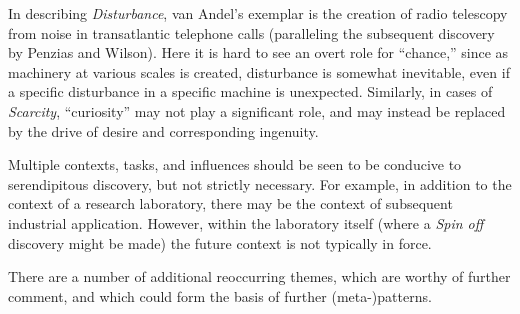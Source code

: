 In describing \emph{Disturbance}, van Andel's exemplar is the
creation of radio telescopy from noise in transatlantic telephone calls
(paralleling the subsequent discovery by Penzias and Wilson).  Here it
is hard to see an overt role for ``chance,'' since as machinery at
various scales is created, disturbance is somewhat inevitable, even if
a specific disturbance in a specific machine is unexpected.
Similarly, in cases of \emph{Scarcity}, ``curiosity'' may not play a
significant role, and may instead be replaced by the drive of desire
and corresponding ingenuity.

Multiple contexts, tasks, and influences should be seen to be
conducive to serendipitous discovery, but not strictly necessary.  For
example, in addition to the context of a research laboratory, there
may be the context of subsequent industrial application.  However,
within the laboratory itself (where a \emph{Spin off} discovery might
be made) the future context is not typically in force.

There are a number of additional reoccurring themes, which are worthy
of further comment, and which could form the basis of further
(meta-)patterns.

